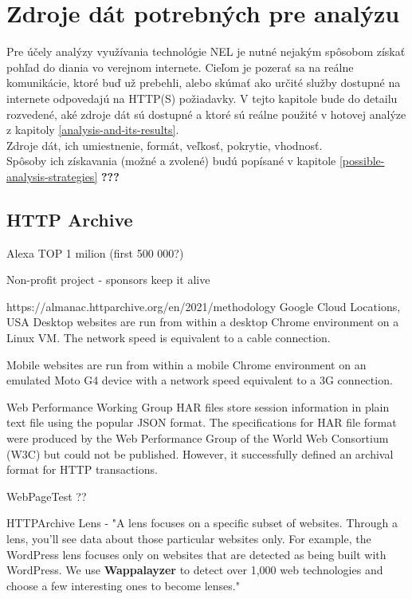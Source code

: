 \chapter{Zdroje dát potrebných pre analýzu}
\label{data-sources-available-for-research}

Pre účely analýzy využívania technológie NEL je nutné nejakým spôsobom získať pohľad do diania vo verejnom internete.
Cieľom je pozerať sa na reálne komunikácie, ktoré buď už prebehli, alebo skúmať ako určité služby dostupné na internete
odpovedajú na HTTP(S) požiadavky. V tejto kapitole bude do detailu rozvedené, aké zdroje dát sú dostupné a ktoré sú reálne
použité v hotovej analýze z kapitoly \ref{analysis-and-its-results}.
\\
Zdroje dát, ich umiestnenie, formát, veľkosť, pokrytie, vhodnosť.
\\
Spôsoby ich získavania (možné a zvolené) budú popísané v kapitole \ref{possible-analysis-strategies} \textbf{???}

\section{HTTP Archive}

Alexa TOP 1 milion (first 500 000?)

Non-profit project - sponsors keep it alive

https://almanac.httparchive.org/en/2021/methodology
Google Cloud Locations, USA
Desktop websites are run from within a desktop Chrome environment on a Linux VM. The network speed is equivalent to a cable connection.

Mobile websites are run from within a mobile Chrome environment on an emulated Moto G4 device with a network speed equivalent to a 3G connection.

Web Performance Working Group
HAR files store session information in plain text file using the popular JSON format. The specifications for HAR file format were produced by the Web Performance Group of the World Web Consortium (W3C) but could not be published. However, it successfully defined an archival format for HTTP transactions.

WebPageTest ??

HTTPArchive Lens - "A lens focuses on a specific subset of websites. Through a lens, you'll see data about those particular websites only. For example, the WordPress lens focuses only on websites that are detected as being built with WordPress. We use \textbf{Wappalayzer} to detect over 1,000 web technologies and choose a few interesting ones to become lenses."

